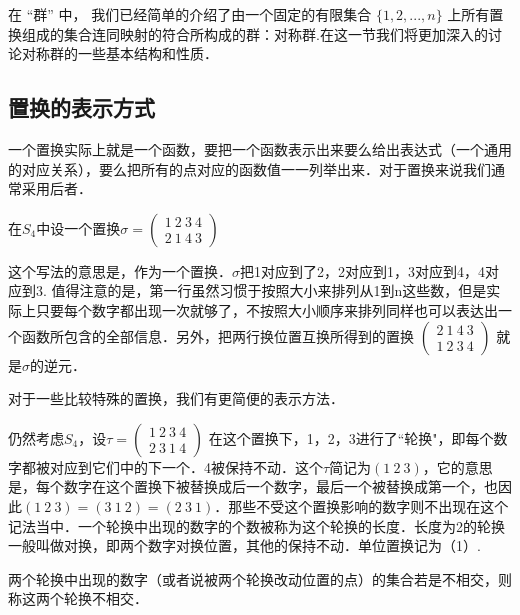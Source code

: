 

在 “群” 中， 我们已经简单的介绍了由一个固定的有限集合 $\{1, 2, ..., n\}$ 上所有置换组成的集合连同映射的符合所构成的群：对称群.在这一节我们将更加深入的讨论对称群的一些基本结构和性质．

\subsection{置换的表示方式}
一个置换实际上就是一个函数，要把一个函数表示出来要么给出表达式（一个通用的对应关系），要么把所有的点对应的函数值一一列举出来．对于置换来说我们通常采用后者．
\begin{example}{}
在$S_4$中设一个置换$\sigma=\begin{pmatrix}
1\ 2\ 3\ 4\\ 2\ 1\ 4\ 3
\end{pmatrix}$
\end{example}
这个写法的意思是，作为一个置换．$\sigma$把1对应到了2，2对应到1，3对应到4，4对应到3. 值得注意的是，第一行虽然习惯于按照大小来排列从1到n这些数，但是实际上只要每个数字都出现一次就够了，不按照大小顺序来排列同样也可以表达出一个函数所包含的全部信息．另外，把两行换位置互换所得到的置换
$\begin{pmatrix}
2\ 1\ 4\ 3\\ 1\ 2\ 3\ 4
\end{pmatrix}$
就是$\sigma$的逆元．


对于一些比较特殊的置换，我们有更简便的表示方法．
\begin{example}{}
仍然考虑$S_4$，设$\tau=\begin{pmatrix}
1\ 2\ 3\ 4\\ 2\ 3\ 1\ 4
\end{pmatrix}$ 在这个置换下，1，2，3进行了“轮换"，即每个数字都被对应到它们中的下一个．4被保持不动．这个$\tau$简记为$(1\ 2\ 3)$，它的意思是，每个数字在这个置换下被替换成后一个数字，最后一个被替换成第一个，也因此$(1\ 2\ 3)=(3\ 1\ 2)=(2\ 3\ 1)$．那些不受这个置换影响的数字则不出现在这个记法当中．一个轮换中出现的数字的个数被称为这个轮换的长度．长度为2的轮换一般叫做对换，即两个数字对换位置，其他的保持不动．单位置换记为（1）.
\end{example}

\begin{definition}{}
两个轮换中出现的数字（或者说被两个轮换改动位置的点）的集合若是不相交，则称这两个轮换不相交．
\end{definition}

